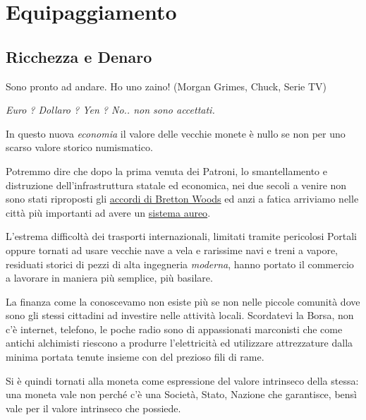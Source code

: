 \section{Equipaggiamento}\hypertarget{equipaggiamento}{}\label{equipaggiamento}

\subsection{Ricchezza e Denaro}
\begin{enfasi}{\begin{center}Sono pronto ad andare. Ho uno zaino! (Morgan Grimes, Chuck, Serie TV)\end{center}
}\end{enfasi}

\begin{multicols}{2}

\label{ricchezza-e-denaro}

\textit{Euro ? Dollaro ? Yen ? No.. non sono accettati.}

In questo nuova \emph{economia} il valore delle vecchie monete è nullo se non per uno scarso valore storico numismatico.

Potremmo dire che dopo la prima venuta dei Patroni, lo smantellamento e distruzione dell'infrastruttura statale ed economica, nei due secoli a venire non sono stati riproposti gli \href{https://it.wikipedia.org/wiki/Accordi_di_Bretton_Woods}{accordi di Bretton Woods} ed anzi a fatica arriviamo nelle città più importanti ad avere un \href{https://it.wikipedia.org/wiki/Sistema_aureo}{sistema aureo}.

L'estrema difficoltà dei trasporti internazionali, limitati tramite pericolosi Portali oppure tornati ad usare vecchie nave a vela e rarissime navi e treni a vapore, residuati storici di pezzi di alta ingegneria \emph{moderna}, hanno portato il commercio a lavorare in maniera più semplice, più basilare.

La finanza come la conoscevamo non esiste più se non nelle piccole comunità dove sono gli stessi cittadini ad investire nelle attività locali. Scordatevi la Borsa, non c'è internet, telefono, le poche radio sono di appassionati marconisti che come antichi alchimisti riescono a produrre l'elettricità ed utilizzare attrezzature dalla minima portata tenute insieme con del prezioso fili di rame.

Si è quindi tornati alla moneta come espressione del valore intrinseco della stessa: una moneta vale non perché c'è una Società, Stato, Nazione che garantisce, bensì vale per il valore intrinseco che possiede.


\end{multicols}
